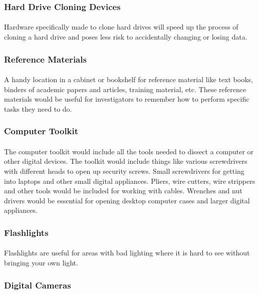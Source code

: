 \documentclass{article}
\begin{document}
\subsubsection{Hard Drive Cloning Devices}
\paragraph{}
Hardware specifically made to clone hard drives will speed up the process of cloning a hard drive and poses less risk to accidentally changing or losing data.
\subsubsection{Reference Materials}
\paragraph{}
A handy location in a cabinet or bookshelf for reference material like text books, binders of academic papers and articles, training material, etc.
These reference materials would be useful for investigators to remember how to perform specific tasks they need to do.
\subsubsection{Computer Toolkit}
\paragraph{}
The computer toolkit would include all the tools needed to dissect a computer or other digital devices.
The toolkit would include things like various screwdrivers with different heads to open up security screws. 
Small screwdrivers for getting into laptops and other small digital appliances. 
Pliers, wire cutters, wire strippers and other tools would be included for working with cables. 
Wrenches and nut drivers would be essential for opening desktop computer cases and larger digital appliances. 
\subsubsection{Flashlights}
\paragraph{}
Flashlights are useful for areas with bad lighting where it is hard to see without bringing your own light. 
\subsubsection{Digital Cameras}
\end{document}

